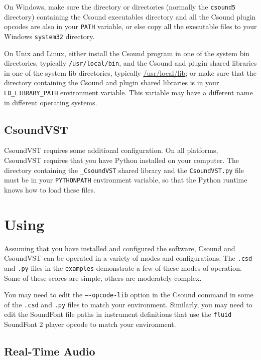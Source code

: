 \documentclass[10pt,letterpaper,onecolumn]{ltxguide}
\begin{document}
On Windows, make sure the directory or directories (normally the \texttt{csound5} directory) containing the Csound executables directory and all the Csound plugin opcodes are also in your \texttt{PATH} variable, or else copy all the executable files to your Windows \texttt{system32} directory.

On Unix and Linux, either install the Csound program in one of the system bin directories, typically \texttt{/usr/local/bin}, and the Csound and plugin shared libraries in one of the system lib directories, typically \url{/usr/local/lib}; or make sure that the directory containing the Csound and plugin shared libraries is in your \texttt{LD\_LIBRARY\_PATH} environment variable. This variable may have a different name in different operating systems.

\subsection{CsoundVST}

CsoundVST requires some additional configuration. On all platforms, CsoundVST requires that you have Python installed on your computer. The directory containing the \texttt{\_CsoundVST} shared library and the \texttt{CsoundVST.py} file must be in your \texttt{PYTHONPATH} environment variable, so that the Python runtime knows how to load these files.

\section{Using}

Assuming that you have installed and configured the software, Csound and CsoundVST can be operated in a variety of modes and configurations. The \texttt{.csd} and \texttt{.py} files in the \texttt{examples} demonstrate a few of these modes of operation. Some of these scores are simple, others are moderately complex. 

You may need to edit the \texttt{----opcode-lib} option in the Csound command in some of the  \texttt{.csd} and \texttt{.py} files to match your environment. Similarly, you may need to edit the SoundFont file paths in instrument definitions that use the \texttt{fluid} SoundFont 2 player opcode to match your environment.

\subsection{Real-Time Audio}
\end{document}
